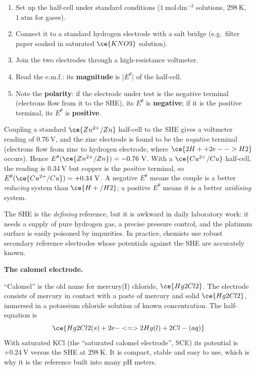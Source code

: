 \documentclass[11pt]{article}
\newcounter{popsec}
\newcounter{popsub}
\newcommand{\courssub}[1]{%
  \stepcounter{popsub}%
  \par\vspace{9pt}\noindent{\popxbold\fontsize{11.5}{13}\selectfont\color{popink}{\color{poporange}\thepopsec.\thepopsub}\hspace{6pt}#1}\par\nopagebreak\vspace{4pt}
}
\begin{document}
\begin{methode}
\begin{enumerate}
\item Set up the half-cell under standard conditions ($1\ \mathrm{mol\,dm^{-3}}$ solutions, $298\ \mathrm{K}$, $1\ \mathrm{atm}$ for gases).
\item Connect it to a standard hydrogen electrode with a salt bridge (e.g.\ filter paper soaked in saturated $\ce{KNO3}$ solution).
\item Join the two electrodes through a high-resistance voltmeter.
\item Read the e.m.f.: its \textbf{magnitude} is $\lvert E^{\theta} \rvert$ of the half-cell.
\item Note the \textbf{polarity}: if the electrode under test is the negative terminal (electrons flow from it to the SHE), its $E^{\theta}$ is \textbf{negative}; if it is the positive terminal, its $E^{\theta}$ is \textbf{positive}.
\end{enumerate}
\end{methode}

\begin{exemplebox}
Coupling a standard $\ce{Zn^{2+}/Zn}$ half-cell to the SHE gives a voltmeter reading of $0.76\ \mathrm{V}$, and the zinc electrode is found to be the \emph{negative} terminal (electrons flow from zinc to hydrogen electrode, where $\ce{2H+ + 2e- -> H2}$ occurs). Hence $E^{\theta}(\ce{Zn^{2+}/Zn}) = -0.76\ \mathrm{V}$. With a $\ce{Cu^{2+}/Cu}$ half-cell, the reading is $0.34\ \mathrm{V}$ but copper is the \emph{positive} terminal, so $E^{\theta}(\ce{Cu^{2+}/Cu}) = +0.34\ \mathrm{V}$. A negative $E^{\theta}$ means the couple is a better \emph{reducing} system than $\ce{H+/H2}$; a positive $E^{\theta}$ means it is a better \emph{oxidising} system.
\end{exemplebox}

\courssub{Other Reference Electrodes}

The SHE is the \emph{defining} reference, but it is awkward in daily laboratory work: it needs a supply of pure hydrogen gas, a precise pressure control, and the platinum surface is easily poisoned by impurities. In practice, chemists use robust secondary reference electrodes whose potentials against the SHE are accurately known.

\textbf{The calomel electrode.}\par
``Calomel'' is the old name for mercury(I) chloride, $\ce{Hg2Cl2}$. The electrode consists of mercury in contact with a paste of mercury and solid $\ce{Hg2Cl2}$, immersed in a potassium chloride solution of known concentration. The half-equation is
\[ \ce{Hg2Cl2(s) + 2e- <=> 2Hg(l) + 2Cl-(aq)} \]
With saturated KCl (the ``saturated calomel electrode'', SCE) its potential is $+0.24\ \mathrm{V}$ versus the SHE at $298\ \mathrm{K}$. It is compact, stable and easy to use, which is why it is the reference built into many pH meters.
\end{document}
